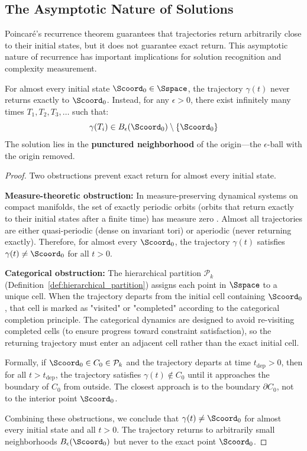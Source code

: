 \subsection{The Asymptotic Nature of Solutions}

Poincaré's recurrence theorem guarantees that trajectories return arbitrarily close to their initial states, but it does not guarantee exact return. This asymptotic nature of recurrence has important implications for solution recognition and complexity measurement.

\begin{theorem}
\label{thm:asymptotic_return}
For almost every initial state $\Scoord_0 \in \Sspace$, the trajectory $\gamma(t)$ never returns exactly to $\Scoord_0$. Instead, for any $\epsilon > 0$, there exist infinitely many times $T_1, T_2, T_3, \ldots$ such that:
\begin{equation}
\gamma(T_i) \in B_\epsilon(\Scoord_0) \setminus \{\Scoord_0\}
\label{eq:punctured_neighborhood}
\end{equation}
The solution lies in the \textbf{punctured neighborhood} of the origin—the $\epsilon$-ball with the origin removed.
\end{theorem}

\begin{proof}
Two obstructions prevent exact return for almost every initial state.

\textbf{Measure-theoretic obstruction:} In measure-preserving dynamical systems on compact manifolds, the set of exactly periodic orbits (orbits that return exactly to their initial states after a finite time) has measure zero \citep{katok1995introduction}. Almost all trajectories are either quasi-periodic (dense on invariant tori) or aperiodic (never returning exactly). Therefore, for almost every $\Scoord_0$, the trajectory $\gamma(t)$ satisfies $\gamma(t) \neq \Scoord_0$ for all $t > 0$.

\textbf{Categorical obstruction:} The hierarchical partition $\mathcal{P}_k$ (Definition~\ref{def:hierarchical_partition}) assigns each point in $\Sspace$ to a unique cell. When the trajectory departs from the initial cell containing $\Scoord_0$, that cell is marked as "visited" or "completed" according to the categorical completion principle. The categorical dynamics are designed to avoid re-visiting completed cells (to ensure progress toward constraint satisfaction), so the returning trajectory must enter an adjacent cell rather than the exact initial cell.

Formally, if $\Scoord_0 \in C_0 \in \mathcal{P}_k$ and the trajectory departs at time $t_{\text{dep}} > 0$, then for all $t > t_{\text{dep}}$, the trajectory satisfies $\gamma(t) \notin C_0$ until it approaches the boundary of $C_0$ from outside. The closest approach is to the boundary $\partial C_0$, not to the interior point $\Scoord_0$.

Combining these obstructions, we conclude that $\gamma(t) \neq \Scoord_0$ for almost every initial state and all $t > 0$. The trajectory returns to arbitrarily small neighborhoods $B_\epsilon(\Scoord_0)$ but never to the exact point $\Scoord_0$.
\end{proof}

